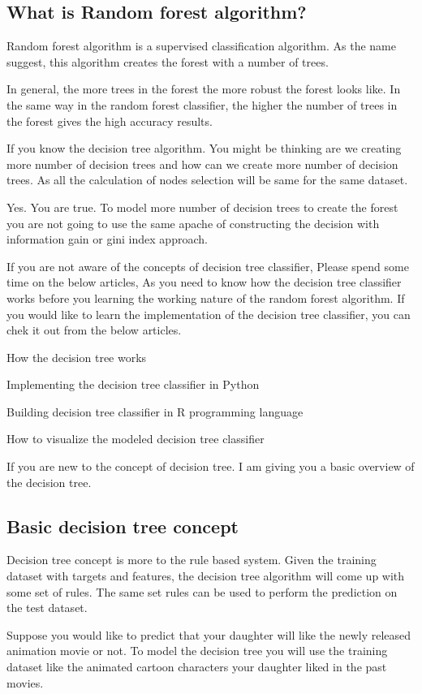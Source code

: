 \documentclass[a4paper,12pt]{article}
\begin{document}
\subsection*{What is Random forest algorithm?}
Random forest algorithm is a supervised classification algorithm. As the name suggest, this algorithm creates the forest with a number of trees.

In general, the more trees in the forest the more robust the forest looks like. In the same way in the random forest classifier, the higher the number of trees in the forest gives the high accuracy results.

If you know the decision tree algorithm. You might be thinking are we creating more number of decision trees and how can we create more number of decision trees. As all the calculation of nodes selection will be same for the same dataset.

Yes. You are true. To model more number of decision trees to create the forest you are not going to use the same apache of constructing the decision with information gain or gini index approach.

If you are not aware of the concepts of decision tree classifier, Please spend some time on the below articles, As you need to know how the decision tree classifier works before you learning the working nature of the random forest algorithm. If you would like to learn the implementation of the decision tree classifier, you can chek it out from the below articles.

How the decision tree works

Implementing the decision tree classifier in Python

Building decision tree classifier in R programming language

How to visualize the modeled decision tree classifier

If you are new to the concept of decision tree. I am giving you a basic overview of the decision tree.

\subsection*{Basic decision tree concept}
Decision tree concept is more to the rule based system. Given the training dataset with targets and features, the decision tree algorithm will come up with some set of rules. The same set rules can be used to perform the prediction on the test dataset.

Suppose you would like to predict that your daughter will like the newly released animation movie or not. To model the decision tree you will use the training dataset like the animated cartoon characters your daughter liked in the past movies.
\end{document}
